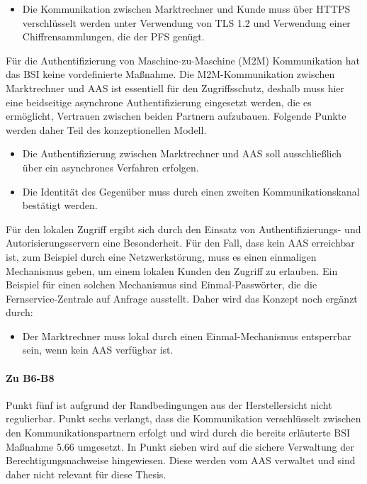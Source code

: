 \documentclass[11pt,a4paper]{report}
\begin{document}
\begin{itemize}[leftmargin=*]
\item Die Kommunikation zwischen Marktrechner und Kunde muss über HTTPS verschlüsselt werden unter Verwendung von TLS 1.2 und Verwendung einer Chiffrensammlungen, die der PFS genügt.
\end{itemize}

Für die Authentifizierung von Maschine-zu-Maschine (M2M) Kommunikation hat das BSI keine vordefinierte Maßnahme. Die M2M-Kommunikation zwischen Marktrechner und AAS ist essentiell für den Zugriffsschutz, deshalb muss hier eine beidseitige asynchrone Authentifizierung eingesetzt werden, die es ermöglicht, Vertrauen zwischen beiden Partnern aufzubauen. Folgende Punkte werden daher Teil des konzeptionellen Modell.

\begin{itemize}[leftmargin=*]
\item Die Authentifizierung zwischen Marktrechner und AAS soll ausschließlich über ein asynchrones Verfahren erfolgen.
\item Die Identität des Gegenüber muss durch einen zweiten Kommunikationskanal bestätigt werden.
\end{itemize}

Für den lokalen Zugriff ergibt sich durch den Einsatz von Authentifizierungs- und Autorisierungsservern eine Besonderheit. Für den Fall, dass kein AAS erreichbar ist, zum Beispiel durch eine Netzwerkstörung, muss es einen einmaligen Mechanismus geben, um einem lokalen Kunden den Zugriff zu erlauben. Ein Beispiel für einen solchen Mechanismus sind Einmal-Passwörter, die die Fernservice-Zentrale auf Anfrage ausstellt. Daher wird das Konzept noch ergänzt durch:

\begin{itemize}[leftmargin=*]
\item Der Marktrechner muss lokal durch einen Einmal-Mechanismus entsperrbar sein, wenn kein AAS verfügbar ist.
\end{itemize}

\paragraph{Zu B6-B8} Punkt fünf ist aufgrund der Randbedingungen aus der Herstellersicht nicht regulierbar. Punkt sechs verlangt, dass die Kommunikation verschlüsselt zwischen den Kommunikationspartnern erfolgt und wird durch die bereits erläuterte BSI Maßnahme 5.66 umgesetzt. In Punkt sieben wird auf die sichere Verwaltung der Berechtigungsnachweise hingewiesen. Diese werden vom AAS verwaltet und sind daher nicht relevant für diese Thesis.
\end{document}

